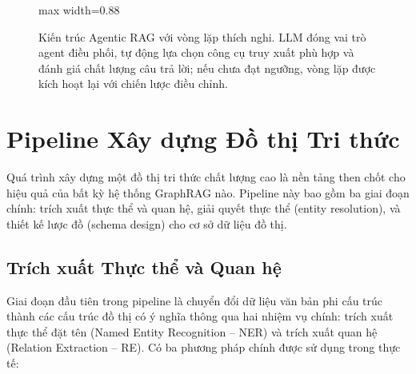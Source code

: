 \documentclass[12pt,a4paper]{report}
\theoremstyle{plain}
\theoremstyle{definition}
\begin{document}
\begin{figure}[htbp]
\begin{adjustbox}{max width=0.88\linewidth}
		\end{adjustbox}
		\caption{Kiến trúc Agentic RAG với vòng lặp thích nghi. LLM đóng vai trò
			agent điều phối, tự động lựa chọn công cụ truy xuất phù hợp và đánh giá
			chất lượng câu trả lời; nếu chưa đạt ngưỡng, vòng lặp được kích hoạt lại
			với chiến lược điều chỉnh.}
		\label{fig:agentic_rag}
	\end{figure}
	
	\section{Pipeline Xây dựng Đồ thị Tri thức}
	\label{sec:kg_pipeline}
	
	Quá trình xây dựng một đồ thị tri thức chất lượng cao là nền tảng then chốt
	cho hiệu quả của bất kỳ hệ thống GraphRAG nào. Pipeline này bao gồm ba giai
	đoạn chính: trích xuất thực thể và quan hệ, giải quyết thực thể (entity
	resolution), và thiết kế lược đồ (schema design) cho cơ sở dữ liệu đồ thị.
	
	\subsection{Trích xuất Thực thể và Quan hệ}
	\label{subsec:ner_relation_extraction}
	
	Giai đoạn đầu tiên trong pipeline là chuyển đổi dữ liệu văn bản phi cấu trúc
	thành các cấu trúc đồ thị có ý nghĩa thông qua hai nhiệm vụ chính: trích xuất
	thực thể đặt tên (Named Entity Recognition -- NER) và trích xuất quan hệ
	(Relation Extraction -- RE). Có ba phương pháp chính được sử dụng trong thực tế:
	
\end{document}
